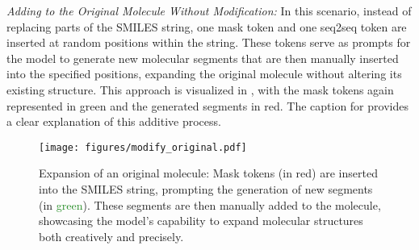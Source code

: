 \textit{Adding to the Original Molecule Without Modification:} In this scenario, instead of replacing parts of the SMILES string, one mask token and one seq2seq token are inserted at random positions within the string. These tokens serve as prompts for the model to generate new molecular segments that are then manually inserted into the specified positions, expanding the original molecule without altering its existing structure. This approach is visualized in , with the mask tokens again represented in green and the generated segments in red. The caption for  provides a clear explanation of this additive process.

    \begin{figure}[!ht]
        \centering
        \texttt{[image: figures/modify\_original.pdf]}
        \caption{Expansion of an original molecule: Mask tokens (in \textcolor{myred}{red}) are inserted into the SMILES string, prompting the generation of new segments (in \textcolor{ForestGreen}{green}). These segments are then manually added to the molecule, showcasing the model's capability to expand molecular structures both creatively and precisely.}
        \label{fig:drugimprovercm_gen_ex2}
    \end{figure}















